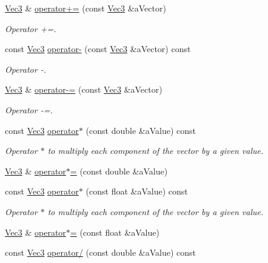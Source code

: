 \begin{DoxyCompactItemize}
\hyperlink{class_math_1_1_vec3}{Vec3} \& \hyperlink{class_math_1_1_vec3_a1c558bd3744c7f5184267d5b72e7b356}{operator+=} (const \hyperlink{class_math_1_1_vec3}{Vec3} \&aVector)
\begin{DoxyCompactList}\small\item\em Operator +=. \end{DoxyCompactList}\item 
const \hyperlink{class_math_1_1_vec3}{Vec3} \hyperlink{class_math_1_1_vec3_a5f3ea1c937cb3a920eb9c4052df155db}{operator-\/} (const \hyperlink{class_math_1_1_vec3}{Vec3} \&aVector) const 
\begin{DoxyCompactList}\small\item\em Operator -\/. \end{DoxyCompactList}\item 
\hyperlink{class_math_1_1_vec3}{Vec3} \& \hyperlink{class_math_1_1_vec3_adc2db7214b9e70e71b953abbcc8e202b}{operator-\/=} (const \hyperlink{class_math_1_1_vec3}{Vec3} \&aVector)
\begin{DoxyCompactList}\small\item\em Operator -\/=. \end{DoxyCompactList}\item 
const \hyperlink{class_math_1_1_vec3}{Vec3} \hyperlink{class_math_1_1_vec3_a95c1535c1a95edcaba9d09aa4131c5cb}{operator$\ast$} (const double \&aValue) const 
\begin{DoxyCompactList}\small\item\em Operator $\ast$ to multiply each component of the vector by a given value. \end{DoxyCompactList}\item 
\hyperlink{class_math_1_1_vec3}{Vec3} \& \hyperlink{class_math_1_1_vec3_a4c6c9c61419433e5b48aea9868daaa65}{operator$\ast$=} (const double \&aValue)
\item 
const \hyperlink{class_math_1_1_vec3}{Vec3} \hyperlink{class_math_1_1_vec3_a21d4315f14832a75c6c5234eb53d0018}{operator$\ast$} (const float \&aValue) const 
\begin{DoxyCompactList}\small\item\em Operator $\ast$ to multiply each component of the vector by a given value. \end{DoxyCompactList}\item 
\hyperlink{class_math_1_1_vec3}{Vec3} \& \hyperlink{class_math_1_1_vec3_a478a1fc0ef190230d112fde763a5aec5}{operator$\ast$=} (const float \&aValue)
\item 
const \hyperlink{class_math_1_1_vec3}{Vec3} \hyperlink{class_math_1_1_vec3_a6fefb99be30180f1ba0bf28650dab021}{operator/} (const double \&aValue) const 

\end{DoxyCompactItemize}
